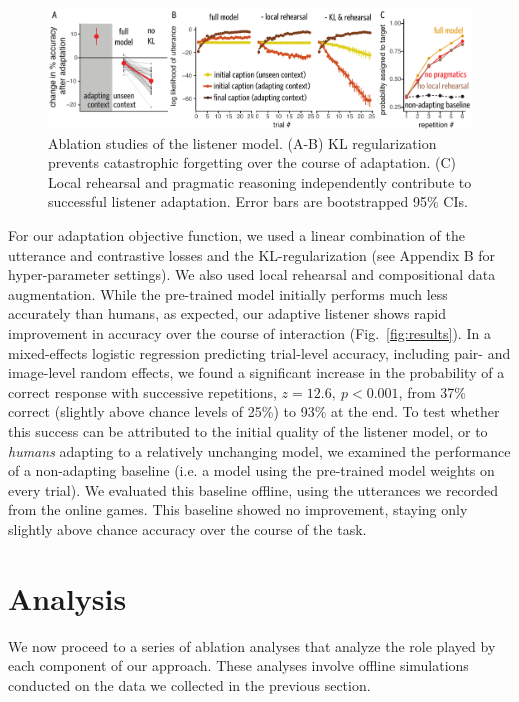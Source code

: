 \documentclass[11pt,a4paper]{article}
\begin{document}
\begin{figure}[t]
\centering
\includegraphics[scale=0.69]{../figures/catForgettingResults.pdf}
\caption{Ablation studies of the listener model. (A-B) KL regularization prevents catastrophic forgetting over the course of adaptation. (C) Local rehearsal and pragmatic reasoning independently contribute to successful listener adaptation. Error bars are bootstrapped 95\% CIs.}
\label{fig:forgetting}
\end{figure}


For our adaptation objective function, we used a linear combination of the utterance and contrastive losses and the KL-regularization (see Appendix B for hyper-parameter settings).
We also used local rehearsal and compositional data augmentation. 
While the pre-trained model initially performs much less accurately than humans, as expected, our adaptive listener shows rapid improvement in accuracy over the course of interaction (Fig.\ \ref{fig:results}).
In a mixed-effects logistic regression predicting trial-level accuracy, including pair- and image-level random effects, we found a significant increase in the probability of a correct response with successive repetitions, $z=12.6,~p <0.001$, from 37\% correct (slightly above chance levels of 25\%) to 93\% at the end.
To test whether this success can be attributed to the initial quality of the listener model, or to \emph{humans} adapting to a relatively unchanging model, we examined the performance of a non-adapting baseline (i.e. a model using the pre-trained model weights on every trial).
We evaluated this baseline offline, using the utterances we recorded from the online games. 
This baseline showed no improvement, staying only slightly above chance accuracy over the course of the task. 




\section{Analysis}
\label{sec:analysis}

We now proceed to a series of ablation analyses that analyze the role played by each component of our approach.
These analyses involve offline simulations conducted on the data we collected in the previous section.
\end{document}
